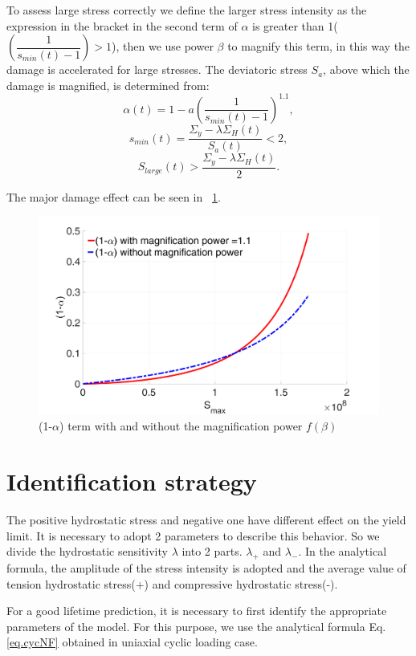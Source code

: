 \documentclass[3p,times,number,review]{elsarticle}
\newcommand{\figref}[1]{\figurename~\ref{#1}}
\begin{document}
To assess large stress correctly we define the larger stress intensity as the expression in the bracket in the second term of $\alpha$ is greater than 1($\left( \dfrac{1}{ s_{min}(t)-1 } \right)>1$), then we use power $\beta$ to magnify this term, in this way the damage is accelerated for large stresses. The deviatoric stress $S_{a}$, above which the damage is magnified,  is determined from: 
$$\alpha(t)=1-a\left( \dfrac{1}{ s_{min}(t)-1 } \right)^{1.1},$$
$$s_{min}(t)=\dfrac{\Sigma_y-\lambda \Sigma_H(t)}{S_{a}(t)}<2,$$
$$S_{large}(t)>\dfrac{\Sigma_y-\lambda \Sigma_H(t)}{2}.$$ 

The major damage effect can be seen in \figref{fig.SmaxSequence}.

\begin{figure}[!h]
\centering
\includegraphics[width=\textwidth]{figures//alp_Smax_fb.png} 
\caption{(1-$\alpha$) term with and without the magnification power $f(\beta)$}
\label{fig.SmaxSequence}
\end{figure}

\clearpage
\section{Identification strategy}
\label{sec:5.9}
The positive hydrostatic stress and negative one have different effect on the yield limit. It is necessary to adopt 2 parameters to describe this behavior. So we divide the hydrostatic sensitivity $\lambda$ into 2 parts. $\lambda_+$ and $\lambda_-$. In the analytical formula, the amplitude of the stress intensity is adopted and the average value of tension hydrostatic stress(+) and compressive hydrostatic stress(-).

For a good lifetime prediction, it is necessary to first identify the appropriate parameters of the model. For this purpose, we use the analytical formula Eq.\eqref{eq.cycNF} obtained in uniaxial cyclic loading case.
\end{document}
